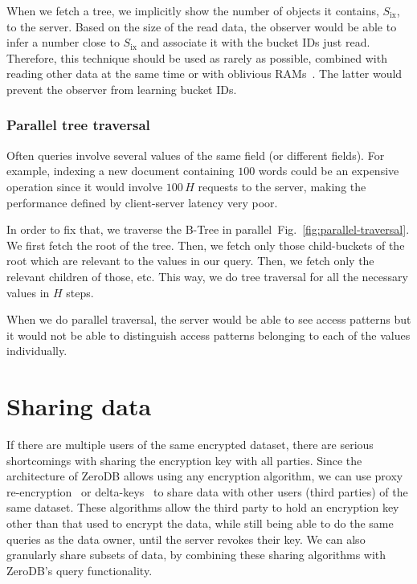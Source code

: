 \documentclass[notitlepage]{revtex4-1}
\newcommand{\figref}[1]{Fig.~\ref{#1}}
\begin{document}
When we fetch a tree, we implicitly show the number of objects it contains, $S_{\mbox{ix}}$, to the server.
Based on the size of the read data, the observer would be able to infer a number close to $S_{\mbox{ix}}$ and associate it with the bucket IDs just read.
Therefore, this technique should be used as rarely as possible, combined with reading other data at the same time or with oblivious RAMs~\cite{path-oram,burst-oram,oram-multicloud,ods-wang-2014}.
The latter would prevent the observer from learning bucket IDs.

\subsubsection{Parallel tree traversal}
\label{sec:parallel-traversal}

Often queries involve several values of the same field (or different fields).
For example, indexing a new document containing $100$ words could be an expensive operation since it would involve $100\,H$ requests to the server, making the performance defined by client-server latency very poor.

In order to fix that, we traverse the B-Tree in parallel~\figref{fig:parallel-traversal}.
We first fetch the root of the tree.
Then, we fetch only those child-buckets of the root which are relevant to the values in our query.
Then, we fetch only the relevant children of those, etc.
This way, we do tree traversal for all the necessary values in $H$ steps.

When we do parallel traversal, the server would be able to see access patterns but it would not be able to distinguish access patterns belonging to each of the values individually.

\section{Sharing data}

If there are multiple users of the same encrypted dataset, there are serious shortcomings with sharing the encryption key with all parties.
Since the architecture of ZeroDB allows using any encryption algorithm, we can use proxy re-encryption~\cite{afgh,libert2011unidirectional}
or delta-keys~\cite{delta-keys,mylar} to share data with other users (third parties) of the same dataset.
These algorithms allow the third party to hold an encryption key other than that used to encrypt the data,
while still being able to do the same queries as the data owner, until the server revokes their key.
We can also granularly share subsets of data, by combining these sharing algorithms with ZeroDB's query functionality.
\end{document}
